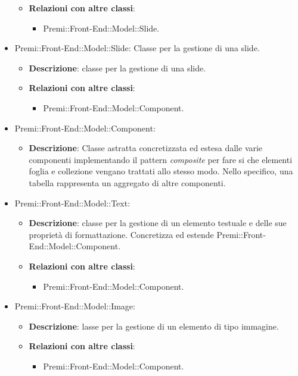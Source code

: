 \begin{itemize}
\begin{itemize}
		\item \textbf{Relazioni con altre classi}:
		\begin{itemize}
			\item Premi::Front-End::Model::Slide.
		\end{itemize}
	\end{itemize}
	\item Premi::Front-End::Model::Slide: Classe per la gestione di una \gls{slide}.
	\begin{itemize}
		\item \textbf{Descrizione}: classe per la gestione di una \gls{slide}.
		\item \textbf{Relazioni con altre classi}:
		\begin{itemize}
			\item Premi::Front-End::Model::Component.
		\end{itemize}
	\end{itemize}
	\item  Premi::Front-End::Model::Component:
	\begin{itemize}
		\item \textbf{Descrizione}: Classe astratta concretizzata ed estesa dalle varie componenti implementando il pattern \textit{composite} per fare si che elementi foglia e collezione vengano trattati allo stesso modo. Nello specifico, una tabella rappresenta un aggregato di altre componenti.
	\end{itemize}
	\item  Premi::Front-End::Model::Text:
	\begin{itemize}
		\item \textbf{Descrizione}: classe per la gestione di un elemento testuale e delle sue proprietà di formattazione. Concretizza ed estende Premi::Front-End::Model::Component.
		\item \textbf{Relazioni con altre classi}:
		\begin{itemize}
			\item Premi::Front-End::Model::Component.
		\end{itemize}
	\end{itemize}
	\item  Premi::Front-End::Model::Image:
	\begin{itemize}
		\item \textbf{Descrizione}: lasse per la gestione di un elemento di tipo immagine.
		\item \textbf{Relazioni con altre classi}:
		\begin{itemize}
			\item Premi::Front-End::Model::Component.

\end{itemize}
\end{itemize}
\end{itemize}
